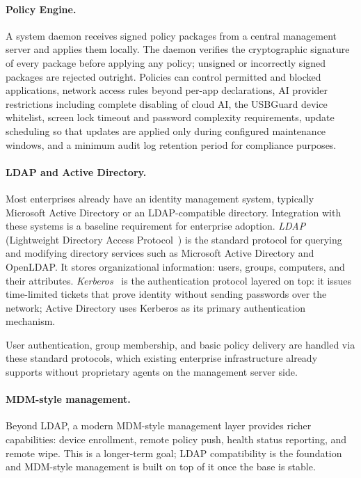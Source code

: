 \paragraph{Policy Engine.}
A system daemon receives signed policy packages from a central management
server and applies them locally. The daemon verifies the cryptographic
signature of every package before applying any policy; unsigned or incorrectly
signed packages are rejected outright. Policies can control permitted and
blocked applications, network access rules beyond per-app declarations, AI
provider restrictions including complete disabling of cloud AI, the USBGuard
device whitelist, screen lock timeout and password complexity requirements,
update scheduling so that updates are applied only during configured maintenance
windows, and a minimum audit log retention period for compliance purposes.

\paragraph{LDAP and Active Directory.}
Most enterprises already have an identity management system, typically
Microsoft Active Directory or an LDAP-compatible directory. Integration
with these systems is a baseline requirement for enterprise adoption.
\emph{LDAP} (Lightweight Directory Access Protocol~\cite{rfc4511}) is the
standard protocol for querying and modifying directory services such as
Microsoft Active Directory and OpenLDAP. It stores organizational information:
users, groups, computers, and their attributes. \emph{Kerberos}~\cite{rfc4120}
is the authentication protocol layered on top: it issues time-limited tickets
that prove identity without sending passwords over the network; Active Directory
uses Kerberos as its primary authentication mechanism.

User authentication, group membership, and basic policy delivery are handled
via these standard protocols, which existing enterprise infrastructure already
supports without proprietary agents on the management server side.

\paragraph{MDM-style management.}
Beyond LDAP, a modern MDM-style management layer provides richer capabilities:
device enrollment, remote policy push, health status reporting, and remote
wipe. This is a longer-term goal; LDAP compatibility is the foundation and
MDM-style management is built on top of it once the base is stable.

